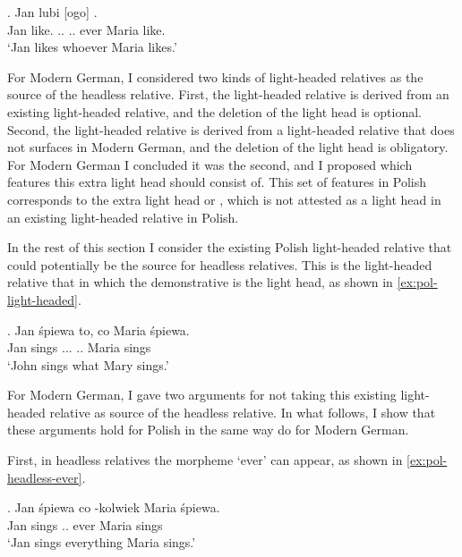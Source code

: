 \exg. Jan lubi [ogo]    .\\
Jan like.\scsub{[acc]} .. .. ever Maria like.\scsub{[acc]}\\
`Jan likes whoever Maria likes.' \label{ex:pol-elh-rp}

For Modern German, I considered two kinds of light-headed relatives as the source of the headless relative.
First, the light-headed relative is derived from an existing light-headed relative, and the deletion of the light head is optional. Second, the light-headed relative is derived from a light-headed relative that does not surfaces in Modern German, and the deletion of the light head is obligatory.
For Modern German I concluded it was the second, and I proposed which features this extra light head should consist of. This set of features in Polish corresponds to the extra light head  or , which is not attested as a light head in an existing light-headed relative in Polish.

In the rest of this section I consider the existing Polish light-headed relative that could potentially be the source for headless relatives. This is the light-headed relative that in which the demonstrative is the light head, as shown in \ref{ex:pol-light-headed}.

\exg. Jan śpiewa to, co Maria śpiewa.\\
Jan sings ... .. Maria sings\\
`John sings what Mary sings.' \label{ex:pol-light-headed}

For Modern German, I gave two arguments for not taking this existing light-headed relative as source of the headless relative. In what follows, I show that these arguments hold for Polish in the same way do for Modern German.

First, in headless relatives the morpheme  `ever' can appear, as shown in \ref{ex:pol-headless-ever}.

\exg. Jan śpiewa co -kolwiek Maria śpiewa.\\
Jan sings .. ever Maria sings\\
`Jan sings everything Maria sings.' \label{ex:pol-headless-ever}

